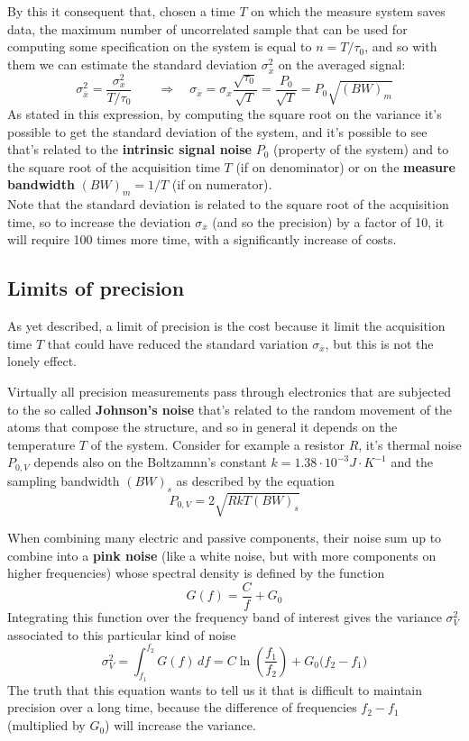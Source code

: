 		By this it consequent that, chosen a time $T$ on which the measure system saves data, the maximum number of uncorrelated sample that can be used for computing some specification on the system is equal to $n = T/\tau_0$, and so with them we can estimate the standard deviation $\sigma^2_{\overline x}$ on the averaged signal:
		\[ \sigma_{\overline x}^2 = \frac{\sigma_x^2}{T/\tau_0} \qquad \Rightarrow \quad \sigma_{\overline x} =\sigma_x \frac{\sqrt{\tau_0}}{\sqrt {T}} = \frac{P_0}{\sqrt {T}} = P_0 \sqrt{(BW)_m} \]
		As stated in this expression, by computing the square root on the variance it's possible to get the standard deviation of the system, and it's possible to see that's related to the \textbf{intrinsic signal noise} $P_0$ (property of the system) and to the square root of the acquisition time $T$ (if on denominator) or on the \textbf{measure bandwidth} $(BW)_m = 1/T$ (if on numerator). \\
		Note that the standard deviation is related to the square root of the acquisition time, so to increase the deviation $\sigma_{\overline x}$ (and so the precision) by a factor of 10, it will require 100 times more time, with a significantly increase of costs.
		
	\subsection{Limits of precision}
		
		As yet described, a limit of precision is the cost because it limit the acquisition time $T$ that could have reduced the standard variation $\sigma_{\overline x}$, but this is not the lonely effect.
		
		Virtually all precision measurements pass through electronics that are subjected to the so called \textbf{Johnson's noise} that's related to the random movement of the atoms that compose the structure, and so in general it depends on the temperature $T$ of the system. Consider for example a resistor $R$, it's thermal noise $P_{0,V}$ depends also on the Boltzamnn's constant $k = 1.38\cdot 10^{-3} J \cdot K^{-1}$ and the sampling bandwidth $(BW)_s$ as described by the equation
		\begin{equation}
			P_{0,V} = 2 \sqrt{RkT (BW)_s}
		\end{equation}
		
		When combining many electric and passive components, their noise sum up to combine into a \textbf{pink noise} (like a white noise, but with more components on higher frequencies) whose spectral density is defined by the function
		\[ G(f) = \frac C f + G_0 \]
		Integrating this function over the frequency band of interest gives the variance $\sigma^2_V$ associated to this particular kind of noise
		\begin{equation}
			\sigma_V^2 = \int_{f_1}^ {f_2} G(f)\, df = C \ln \left( \frac{f_1}{f_2} \right) + G_0 \big(f_2-f_1\big)
		\end{equation}
		The truth that this equation wants to tell us it that is difficult to maintain precision over a long time, because the difference of frequencies $f_2-f_1$ (multiplied by $G_0$) will increase the variance.
		
